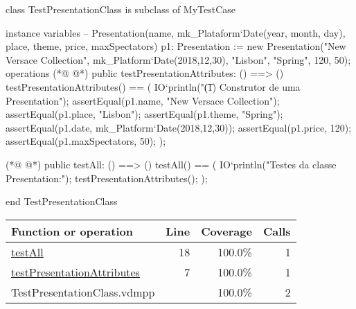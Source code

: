 \begin{vdmpp}[breaklines=true]
class TestPresentationClass is subclass of MyTestCase

instance variables
 -- Presentation(name, mk_Plataform`Date(year, month, day), place, theme, price, maxSpectators)
 p1: Presentation := new Presentation("New Versace Collection", mk_Platform`Date(2018,12,30), "Lisbon", "Spring", 120, 50);
operations
(*@
\label{testPresentationAttributes:7}
@*)
 public testPresentationAttributes: () ==> ()
 testPresentationAttributes() == (
  IO`println("\t (1) Construtor de uma Presentation");
  assertEqual(p1.name, "New Versace Collection");
  assertEqual(p1.place, "Lisbon");
  assertEqual(p1.theme, "Spring");
  assertEqual(p1.date, mk_Platform`Date(2018,12,30));
  assertEqual(p1.price, 120);
  assertEqual(p1.maxSpectators, 50);
 );
  
(*@
\label{testAll:18}
@*)
 public testAll: () ==> ()
 testAll() == (
 IO`println("Testes da classe Presentation:");
  testPresentationAttributes();
 );
 
end TestPresentationClass
\end{vdmpp}
\bigskip
\begin{longtable}{|l|r|r|r|}
\hline
Function or operation & Line & Coverage & Calls \\
\hline
\hline
\hyperref[testAll:18]{testAll} & 18&100.0\% & 1 \\
\hline
\hyperref[testPresentationAttributes:7]{testPresentationAttributes} & 7&100.0\% & 1 \\
\hline
\hline
TestPresentationClass.vdmpp & & 100.0\% & 2 \\
\hline
\end{longtable}

